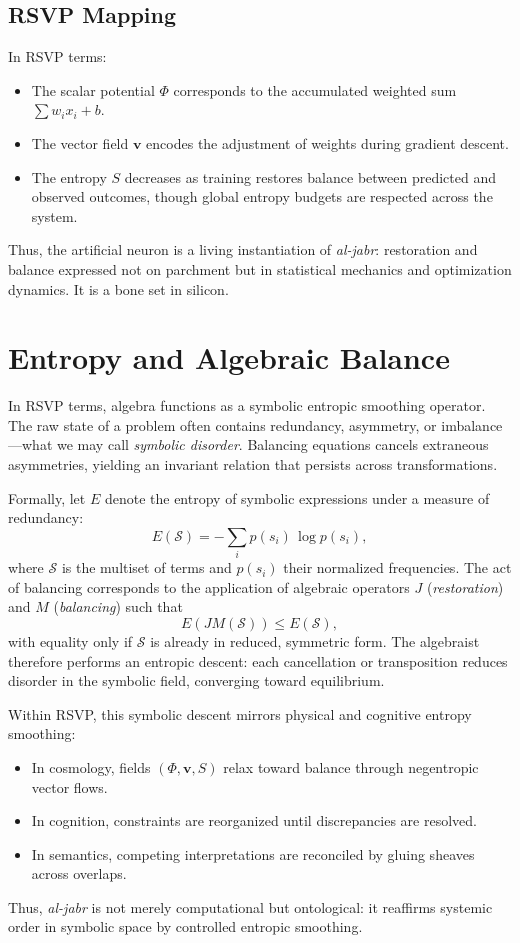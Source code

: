 \documentclass[a4paper,11pt,openany]{book}
\begin{document}
\subsection*{RSVP Mapping}
In RSVP terms:
\begin{itemize}
  \item The scalar potential $\Phi$ corresponds to the accumulated weighted sum $\sum w_i x_i + b$.
  \item The vector field $\mathbf{v}$ encodes the adjustment of weights during gradient descent.
  \item The entropy $S$ decreases as training restores balance between predicted and observed 
        outcomes, though global entropy budgets are respected across the system.
\end{itemize}

Thus, the artificial neuron is a living instantiation of \emph{al-jabr}: restoration and balance 
expressed not on parchment but in statistical mechanics and optimization dynamics. It is a 
bone set in silicon.

\section{Entropy and Algebraic Balance}

In RSVP terms, algebra functions as a symbolic entropic smoothing operator. 
The raw state of a problem often contains redundancy, asymmetry, or imbalance---what we may call \emph{symbolic disorder}. 
Balancing equations cancels extraneous asymmetries, yielding an invariant relation that persists across transformations.

Formally, let $E$ denote the entropy of symbolic expressions under a measure of redundancy:
\[
E(\mathcal{S}) = - \sum_{i} p(s_i)\,\log p(s_i),
\]
where $\mathcal{S}$ is the multiset of terms and $p(s_i)$ their normalized frequencies. 
The act of balancing corresponds to the application of algebraic operators $J$ (\emph{restoration}) and $M$ (\emph{balancing}) such that
\[
E(JM(\mathcal{S})) \leq E(\mathcal{S}),
\]
with equality only if $\mathcal{S}$ is already in reduced, symmetric form. 
The algebraist therefore performs an entropic descent: each cancellation or transposition reduces disorder in the symbolic field, converging toward equilibrium.

Within RSVP, this symbolic descent mirrors physical and cognitive entropy smoothing:
\begin{itemize}
  \item In cosmology, fields $(\Phi, \mathbf{v}, S)$ relax toward balance through negentropic vector flows.
  \item In cognition, constraints are reorganized until discrepancies are resolved.
  \item In semantics, competing interpretations are reconciled by gluing sheaves across overlaps. 
\end{itemize}
Thus, \emph{al-jabr} is not merely computational but ontological: it reaffirms systemic order in symbolic space by controlled entropic smoothing.
\end{document}

